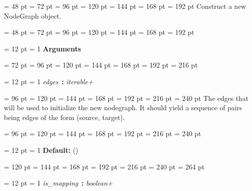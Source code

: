 {{{{\par \noindent  \leftskip = 48 pt  \leftmargini = 72 pt  \leftmarginii = 96 pt  \leftmarginiii = 120 pt  \leftmarginiv = 144 pt  \leftmarginv = 168 pt  \leftmarginvi = 192 pt  Construct a new NodeGraph object.\par}
{\par \noindent  \leftskip = 48 pt  \leftmargini = 72 pt  \leftmarginii = 96 pt  \leftmarginiii = 120 pt  \leftmarginiv = 144 pt  \leftmarginv = 168 pt  \leftmarginvi = 192 pt {\par \noindent
{\par \pagebreak[3.100000] \noindent \hangindent = 12 pt \hangafter = 1 
{\bf Arguments\/}\par}
{\par \noindent  \leftskip = 72 pt  \leftmargini = 96 pt  \leftmarginii = 120 pt  \leftmarginiii = 144 pt  \leftmarginiv = 168 pt  \leftmarginv = 192 pt  \leftmarginvi = 216 pt {\par \noindent
{\par \pagebreak[3.000000] \noindent \hangindent = 12 pt \hangafter = 1 
{\em edges\/}~{\bf :}  {\em iterable+\/}\par}
{\par \noindent  \leftskip = 96 pt  \leftmargini = 120 pt  \leftmarginii = 144 pt  \leftmarginiii = 168 pt  \leftmarginiv = 192 pt  \leftmarginv = 216 pt  \leftmarginvi = 240 pt  The edges that will be used to
         initialize the new nodegraph. It should yield a
         sequence of pairs being edges of the form (source, target).\par}
{\par \noindent  \leftskip = 96 pt  \leftmargini = 120 pt  \leftmarginii = 144 pt  \leftmarginiii = 168 pt  \leftmarginiv = 192 pt  \leftmarginv = 216 pt  \leftmarginvi = 240 pt {\par \noindent
{\par \pagebreak[2.900000] \noindent \hangindent = 12 pt \hangafter = 1 
{\bf Default: \/}()\par}
{\par \noindent  \leftskip = 120 pt  \leftmargini = 144 pt  \leftmarginii = 168 pt  \leftmarginiii = 192 pt  \leftmarginiv = 216 pt  \leftmarginv = 240 pt  \leftmarginvi = 264 pt \par}
\par}
\par}
{\par \pagebreak[3.000000] \noindent \hangindent = 12 pt \hangafter = 1 
{\em is{\_}mapping\/}~{\bf :}  {\em boolean+\/}\par}
}}}}}}}
